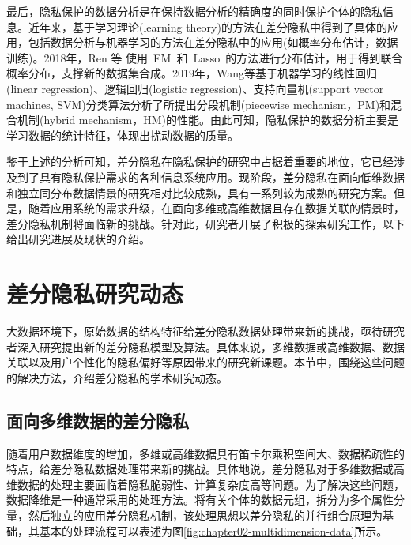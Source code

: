 
最后，隐私保护的数据分析是在保持数据分析的精确度的同时保护个体的隐私信息\cite{wang2016on}。近年来，基于学习理论(learning theory)的方法在差分隐私中得到了具体的应用，包括数据分析与机器学习的方法在差分隐私中的应用\cite{kasiviswanathan2011what,ye2017optimal,sarwate2013signal}(如概率分布估计\cite{Murakami2018Toward}，数据训练\cite{xu2019ganobfuscator})。2018年，Ren 等\cite{ren2018textsf} 使用~EM~和~Lasso~的方法进行分布估计，用于得到联合概率分布，支撑新的数据集合成。2019年，Wang等\cite{wang2019collecting}基于机器学习的线性回归(linear regression)、逻辑回归(logistic regression)、支持向量机(support vector machines, SVM)分类算法分析了所提出分段机制(piecewise mechanism，PM)和混合机制(hybrid mechanism，HM)的性能。由此可知，隐私保护的数据分析主要是学习数据的统计特征，体现出扰动数据的质量。


鉴于上述的分析可知，差分隐私在隐私保护的研究中占据着重要的地位，它已经涉及到了具有隐私保护需求的各种信息系统应用。现阶段，差分隐私在面向低维数据和独立同分布数据情景的研究相对比较成熟，具有一系列较为成熟的研究方案。但是，随着应用系统的需求升级，在面向多维或高维数据且存在数据关联的情景时，差分隐私机制将面临新的挑战。针对此，研究者开展了积极的探索研究工作，以下给出研究进展及现状的介绍。

\section{差分隐私研究动态}
大数据环境下，原始数据的结构特征给差分隐私数据处理带来新的挑战，亟待研究者深入研究提出新的差分隐私模型及算法。具体来说，多维数据或高维数据、数据关联以及用户个性化的隐私偏好等原因带来的研究新课题。本节中，围绕这些问题的解决方法，介绍差分隐私的学术研究动态。

\subsection{面向多维数据的差分隐私}

随着用户数据维度的增加，多维或高维数据具有笛卡尔乘积空间大、数据稀疏性的特点，给差分隐私数据处理带来新的挑战。具体地说，差分隐私对于多维数据或高维数据的处理主要面临着隐私脆弱性、计算复杂度高等问题。为了解决这些问题，数据降维是一种通常采用的处理方法。将有关个体的数据元组，拆分为多个属性分量，然后独立的应用差分隐私机制，该处理思想以差分隐私的并行组合原理为基础，其基本的处理流程可以表述为图\ref{fig:chapter02-multidimension-data}所示。

